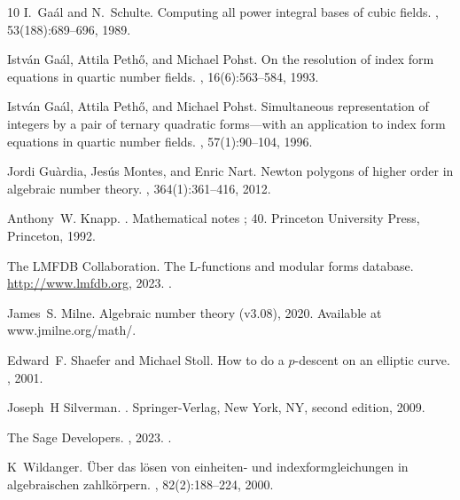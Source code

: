 \documentclass[oneside]{amsart}
\theoremstyle{definition}
\begin{document}
\begin{thebibliography}{10}
I.~Gaál and N.~Schulte.
\newblock Computing all power integral bases of cubic fields.
, 53(188):689--696, 1989.

István Gaál, Attila Pethő, and Michael Pohst.
\newblock On the resolution of index form equations in quartic number fields.
, 16(6):563--584, 1993.

István Gaál, Attila Pethő, and Michael Pohst.
\newblock Simultaneous representation of integers by a pair of ternary
  quadratic forms—with an application to index form equations in quartic
  number fields.
, 57(1):90--104, 1996.

Jordi Gu\`ardia, Jes\'us Montes, and Enric Nart.
\newblock Newton polygons of higher order in algebraic number theory.
, 364(1):361--416, 2012.

Anthony~W. Knapp.
.
\newblock Mathematical notes ; 40. Princeton University Press, Princeton, 1992.

The {LMFDB Collaboration}.
\newblock The {L}-functions and modular forms database.
\newblock \url{http://www.lmfdb.org}, 2023.
\newblock [Online].

James~S. Milne.
\newblock Algebraic number theory (v3.08), 2020.
\newblock Available at www.jmilne.org/math/.

Edward~F. Shaefer and Michael Stoll.
\newblock How to do a $p$-descent on an elliptic curve.
, 2001.

Joseph~H Silverman.
.
\newblock Springer-Verlag, New York, NY, second edition, 2009.

{The Sage Developers}.
, 2023.
.

K~Wildanger.
\newblock Über das lösen von einheiten- und indexformgleichungen in
  algebraischen zahlkörpern.
, 82(2):188--224, 2000.

\end{thebibliography}
\end{document}
